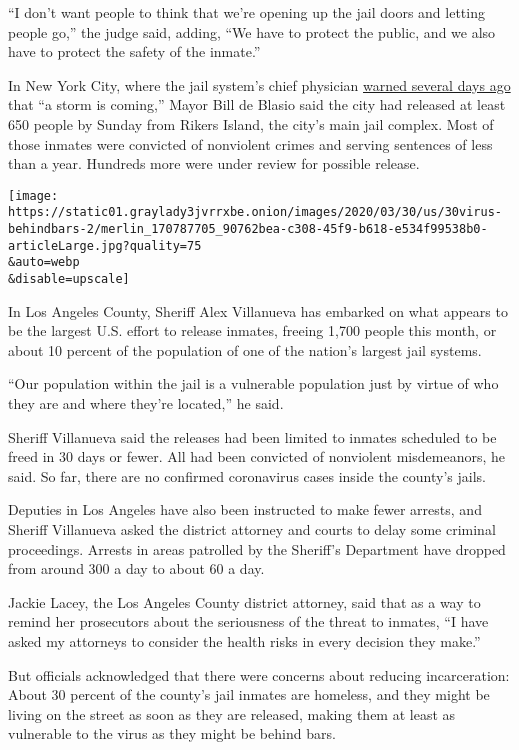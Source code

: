 ``I don't want people to think that we're opening up the jail doors and
letting people go,'' the judge said, adding, ``We have to protect the
public, and we also have to protect the safety of the inmate.''

In New York City, where the jail system's chief physician
\href{https://www.nytimes3xbfgragh.onion/2020/03/20/nyregion/nyc-coronavirus-rikers-island.html}{warned
several days ago} that ``a storm is coming,'' Mayor Bill de Blasio said
the city had released at least 650 people by Sunday from Rikers Island,
the city's main jail complex. Most of those inmates were convicted of
nonviolent crimes and serving sentences of less than a year. Hundreds
more were under review for possible release.

\texttt{[image: https://static01.graylady3jvrrxbe.onion/images/2020/03/30/us/30virus-behindbars-2/merlin\_170787705\_90762bea-c308-45f9-b618-e534f99538b0-articleLarge.jpg?quality=75\\\&auto=webp\\\&disable=upscale]}

In Los Angeles County, Sheriff Alex Villanueva has embarked on what
appears to be the largest U.S. effort to release inmates, freeing 1,700
people this month, or about 10 percent of the population of one of the
nation's largest jail systems.

``Our population within the jail is a vulnerable population just by
virtue of who they are and where they're located,'' he said.

Sheriff Villanueva said the releases had been limited to inmates
scheduled to be freed in 30 days or fewer. All had been convicted of
nonviolent misdemeanors, he said. So far, there are no confirmed
coronavirus cases inside the county's jails.

Deputies in Los Angeles have also been instructed to make fewer arrests,
and Sheriff Villanueva asked the district attorney and courts to delay
some criminal proceedings. Arrests in areas patrolled by the Sheriff's
Department have dropped from around 300 a day to about 60 a day.

Jackie Lacey, the Los Angeles County district attorney, said that as a
way to remind her prosecutors about the seriousness of the threat to
inmates, ``I have asked my attorneys to consider the health risks in
every decision they make.''

But officials acknowledged that there were concerns about reducing
incarceration: About 30 percent of the county's jail inmates are
homeless, and they might be living on the street as soon as they are
released, making them at least as vulnerable to the virus as they might
be behind bars.

